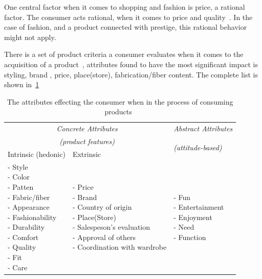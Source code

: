 One central factor when it comes to shopping and fashion is price, a rational factor.
The consumer acts rational, when it comes to price and quality~\cite{Hanf1994}.
In the case of fashion, and a product connected with prestige, this rational
behavior might not apply.

There is a set of product criteria a consumer evaluates when it comes to the
acquisition of a product~\cite{dutton2006}, attributes found to have the most
significant impact is styling, brand , price, place(store), fabrication/fiber
content.  The complete list is shown in~\ref{table:ConsumersPurchaseDec}

\begin{table}[H]
    \centering
    \begin{tabular}{l|l|l}
      \multicolumn{2}{c|}{\emph{Concrete Attributes}} & \emph{Abstract Attributes} \\
      \multicolumn{2}{c|}{\emph{(product features)}} & \multirow{2}{*}{\emph{(attitude-based)}} \\ \cline{1-2}
      Intrinsic (hedonic)   & Extrinsic & \\ \hline
      \pbox{4cm}{
          - Style \\
          - Color \\
          - Patten \\
          - Fabric/fiber \\
          - Appearance \\
          - Fashionability \\
          - Durability \\
          - Comfort \\
          - Quality \\
          - Fit \\
          - Care \\
      } & \pbox{6cm}{
          - Price \\
          - Brand \\
          - Country of origin \\
          - Place(Store) \\
          - Salespeson's evaluation \\
          - Approval of others \\
          - Coordination with wardrobe \\
      } & \pbox{4cm}{
          - Fun \\
          - Entertainment \\
          - Enjoyment \\
          - Need \\
          - Function \\
        } \\ \hline
    \end{tabular}
    \caption[Consumers' Purchase Decisions]{The attributes effecting the consumer when in the process of consuming products~\cite{dutton2006}}
    \label{table:ConsumersPurchaseDec}
\end{table}

